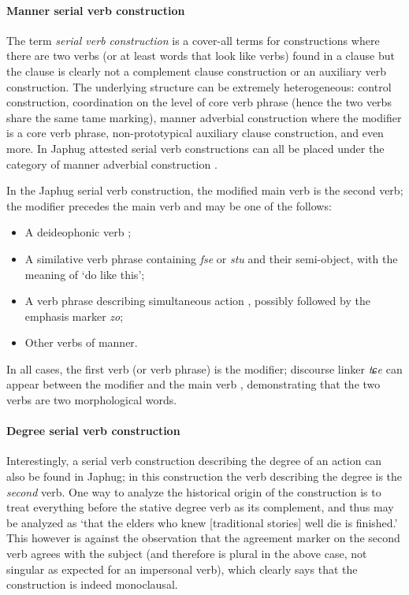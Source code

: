 \documentclass[a4paper, oneside, 12pt]{report}
\newcommand*{\citesec}[1]{\S~{#1}}
\newcommand*{\citepage}[1]{p.~{#1}}
\newcommand*{\term}[1]{\emph{#1}}
\newcommand{\form}[1]{\emph{#1}}
\newcommand{\translate}[1]{`#1'}
\begin{document}
\paragraph*{Manner serial verb construction}

The term \term{serial verb construction} is a cover-all terms for constructions 
where there are two verbs (or at least words that look like verbs) found in a clause 
but the clause is clearly not a complement clause construction or an auxiliary verb construction.
The underlying structure can be extremely heterogeneous:
control construction, coordination on the level of core verb phrase 
(hence the two verbs share the same \ac{tame} marking), 
manner adverbial construction where the modifier is a core verb phrase, 
non-prototypical auxiliary clause construction, and even more.
In Japhug attested serial verb constructions can all be placed under the 
category of manner adverbial construction \citep[\citesec{25.4.1}]{jacques2021grammar}.

In the Japhug serial verb construction,
the modified main verb is the second verb; 
the modifier precedes the main verb and may be one of the follows:
\begin{itemize}
    \item A deideophonic verb \citep[\citesec{25.4.1.1}]{jacques2021grammar};
    \item A similative verb phrase containing \form{fse} or \form{stu} 
        and their semi-object, 
        with the meaning of \translate{do like this};
    \item A verb phrase describing simultaneous action \citep[\citesec{25.4.1.4}]{jacques2021grammar},
    possibly followed by the emphasis marker \form{zo};
    \item Other verbs of manner. 
\end{itemize}
In all cases, the first verb (or verb phrase) is the modifier; 
discourse linker \form{tɕe} can appear between the modifier and the main verb
\citep[\citepage{1408}, (73)]{jacques2021grammar}, 
demonstrating that the two verbs are two morphological words. 

\paragraph*{Degree serial verb construction} 

Interestingly, a serial verb construction describing the degree of an action 
can also be found in Japhug; 
in this construction the verb describing the degree is the \emph{second} verb.
One way to analyze the historical origin of the construction 
is to treat everything before the stative degree verb as its complement,
and thus \citet[\citepage{1410}, (76)]{jacques2021grammar} 
may be analyzed as \translate{that the elders who knew [traditional stories] well die is finished.}
This however is against the observation that the agreement marker on the second verb 
agrees with the subject (and therefore is plural in the above case, 
not singular as expected for an impersonal verb),
which clearly says that the construction is indeed monoclausal.
\end{document}
